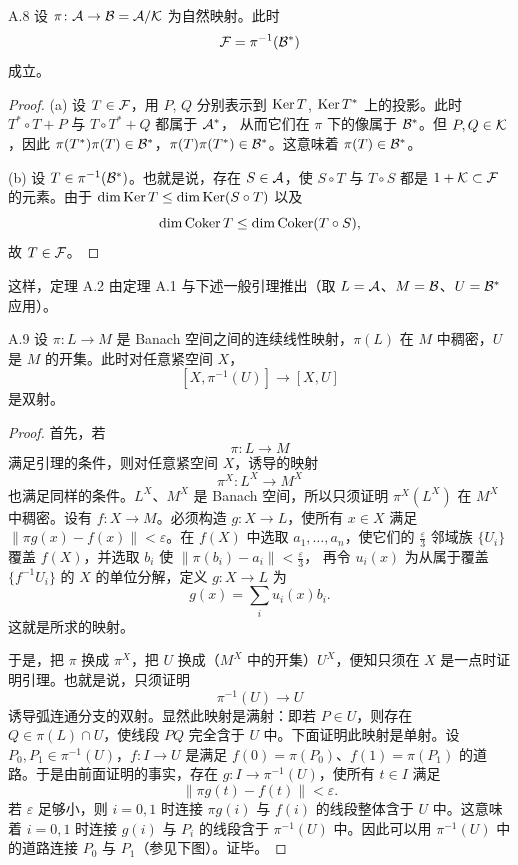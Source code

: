 \begin{proposition*}{A.8}
  设 $\pi\colon\mathcal{A}\to\mathcal{B}=\mathcal{A}/\mathcal{K}$ 为自然映射。此时
  \[
    \mathcal{F}=\pi^{-1}(\mathcal{B}^*)
  \]
  成立。
\end{proposition*}

\begin{proof}
  (a) 设 $T\in\mathcal{F}$，用 $P$, $Q$ 分别表示到 $\operatorname{Ker} T$, $\operatorname{Ker} T^*$ 上的投影。此时 $T^*\circ T+P$ 与 $T\circ T^*+Q$ 都属于 $\mathcal{A}^*$，
  从而它们在 $\pi$ 下的像属于 $\mathcal{B}^*$。但 $P,Q\in\mathcal{K}$，因此 $\pi(T^*)\pi(T)\in\mathcal{B}^*$，$\pi(T)\pi(T^*)\in\mathcal{B}^*$。这意味着 $\pi(T)\in\mathcal{B}^*$。

  (b) 设 $T\in\pi^{-1}(\mathcal{B}^*)$。也就是说，存在 $S\in\mathcal{A}$，使 $S\circ T$ 与 $T\circ S$ 都是 $1+\mathcal{K}\subset\mathcal{F}$ 的元素。由于 $\dim\operatorname{Ker} T\le\dim\operatorname{Ker}(S\circ T)$ 以及
  \[
    \dim\operatorname{Coker} T\le\dim\operatorname{Coker}(T\circ S),
  \]
  故 $T\in\mathcal{F}$。
\end{proof}

这样，定理 A.2 由定理 A.1 与下述一般引理推出（取 $L=\mathcal{A}$、$M=\mathcal{B}$、$U=\mathcal{B}^*$ 应用）。

\begin{lemma*}{A.9}
  设 $\pi\colon L\to M$ 是 Banach 空间之间的连续线性映射，$\pi(L)$ 在 $M$ 中稠密，$U$ 是 $M$ 的开集。此时对任意紧空间 $X$，
  \[
    [X,\pi^{-1}(U)]\longrightarrow[X,U]
  \]
  是双射。
\end{lemma*}

\begin{proof}
  首先，若
  \[
    \pi\colon L\to M
  \]
  满足引理的条件，则对任意紧空间 $X$，诱导的映射
  \[
    \pi^X\colon L^X\to M^X
  \]
  也满足同样的条件。$L^X$、$M^X$ 是 Banach 空间，所以只须证明 $\pi^X(L^X)$ 在 $M^X$ 中稠密。设有 $f\colon X\to M$。必须构造 $g\colon X\to L$，使所有 $x\in X$ 满足 $\|\pi g(x)-f(x)\|<\varepsilon$。在 $f(X)$ 中选取 $a_1,\dots,a_n$，使它们的 $\frac{\varepsilon}{3}$ 邻域族 $\{U_i\}$ 覆盖 $f(X)$，并选取 $b_i$ 使 $\|\pi(b_i)-a_i\|<\frac{\varepsilon}{3}$，
  再令 $u_i(x)$ 为从属于覆盖 $\{f^{-1}U_i\}$ 的 $X$ 的单位分解，定义 $g\colon X\to L$ 为
  \[
    g(x)=\sum_i u_i(x)b_i.
  \]
  这就是所求的映射。

  于是，把 $\pi$ 换成 $\pi^X$，把 $U$ 换成（$M^X$ 中的开集）$U^X$，便知只须在 $X$ 是一点时证明引理。也就是说，只须证明
  \[
    \pi^{-1}(U)\to U
  \]
  诱导弧连通分支的双射。显然此映射是满射：即若 $P\in U$，则存在 $Q\in\pi(L)\cap U$，使线段 $PQ$ 完全含于 $U$ 中。下面证明此映射是单射。设 $P_0,P_1\in\pi^{-1}(U)$，$f\colon I\to U$ 是满足 $f(0)=\pi(P_0)$、$f(1)=\pi(P_1)$ 的道路。于是由前面证明的事实，存在 $g\colon I\to\pi^{-1}(U)$，使所有 $t\in I$ 满足
  \[
    \|\pi g(t)-f(t)\|<\varepsilon.
  \]
  若 $\varepsilon$ 足够小，则 $i=0,1$ 时连接 $\pi g(i)$ 与 $f(i)$ 的线段整体含于 $U$ 中。这意味着 $i=0,1$ 时连接 $g(i)$ 与 $P_i$ 的线段含于 $\pi^{-1}(U)$ 中。因此可以用 $\pi^{-1}(U)$ 中的道路连接 $P_0$ 与 $P_1$（参见下图）。证毕。
\end{proof}

